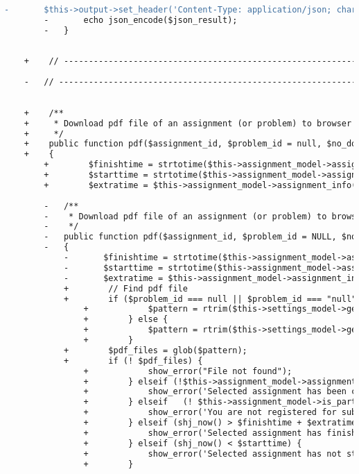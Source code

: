 \begin{lstlisting}[language=diff, caption=Perubahan pada kode Assignments.php]
		-		$this->output->set_header('Content-Type: application/json; charset=utf-8');
		-		echo json_encode($json_result);
		-	}
	
	
	+    // ------------------------------------------------------------------------
	
	-	// ------------------------------------------------------------------------
	
	
	+    /**
	+     * Download pdf file of an assignment (or problem) to browser
	+     */
	+    public function pdf($assignment_id, $problem_id = null, $no_download = false)
	+    {
		+        $finishtime = strtotime($this->assignment_model->assignment_info($assignment_id)['finish_time']);
		+        $starttime = strtotime($this->assignment_model->assignment_info($assignment_id)['start_time']);
		+        $extratime = $this->assignment_model->assignment_info($assignment_id)['extra_time'];
		
		-	/**
		-	 * Download pdf file of an assignment (or problem) to browser
		-	 */
		-	public function pdf($assignment_id, $problem_id = NULL, $no_download = FALSE)
		-	{
			-		$finishtime = strtotime($this->assignment_model->assignment_info($assignment_id)['finish_time']);
			-		$starttime = strtotime($this->assignment_model->assignment_info($assignment_id)['start_time']);
			-		$extratime = $this->assignment_model->assignment_info($assignment_id)['extra_time'];
			+        // Find pdf file
			+        if ($problem_id === null || $problem_id === "null") {
				+            $pattern = rtrim($this->settings_model->get_setting('assignments_root'), '/')."/assignment_{$assignment_id}/*.pdf";
				+        } else {
				+            $pattern = rtrim($this->settings_model->get_setting('assignments_root'), '/')."/assignment_{$assignment_id}/p{$problem_id}/*.pdf";
				+        }
			+        $pdf_files = glob($pattern);
			+        if (! $pdf_files) {
				+            show_error("File not found");
				+        } elseif (!$this->assignment_model->assignment_info($assignment_id)['open']) {
				+            show_error('Selected assignment has been closed.');
				+        } elseif	(! $this->assignment_model->is_participant($this->assignment_model->assignment_info($assignment_id)['participants'], $this->user->username)) {
				+            show_error('You are not registered for submitting.');
				+        } elseif (shj_now() > $finishtime + $extratime) {
				+            show_error('Selected assignment has finished.');
				+        } elseif (shj_now() < $starttime) {
				+            show_error('Selected assignment has not started.');
				+        }
			

\end{lstlisting}

